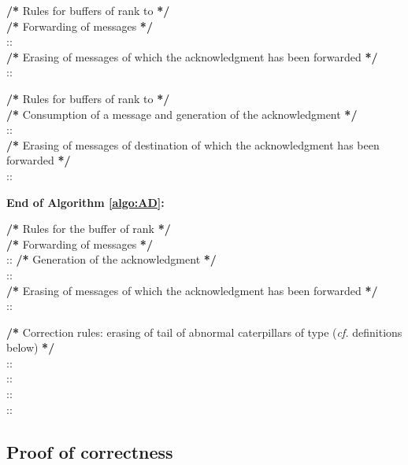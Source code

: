\documentclass[11pt]{article}
\begin{document}
\begin{algorithm}
{\begin{description}
				\item \textbf{/*} Rules for buffers of rank  to  \textbf{*/}\\
					\textbf{/*} Forwarding of messages \textbf{*/}\\
					 :: 
					\\
			\textbf{/*} Erasing of messages of which the acknowledgment has been forwarded \textbf{*/}\\
				 :: 
		\item \textbf{/*} Rules for buffers of rank  to  \textbf{*/}\\
			\textbf{/*} Consumption of a message and generation of the acknowledgment  \textbf{*/}\\
			 ::  \\
	\textbf{/*} Erasing of messages of destination  of which the acknowledgment has been forwarded \textbf{*/}\\
			 :: 
			\end{description}
}
\end{algorithm}

\begin{algorithm}
	\begin{description}
		\item \textbf{End of Algorithm \ref{algo:AD}:}
\small{
			\item \textbf{/*} Rules for the buffer of rank  \textbf{*/}\\
			\textbf{/*} Forwarding of messages \textbf{*/}\\
			 ::  
			\textbf{/*} Generation of the acknowledgment  \textbf{*/}\\
			 ::  \\
			\textbf{/*} Erasing of messages of which the acknowledgment has been forwarded \textbf{*/}\\
			 ::  
		\item \textbf{/*} Correction rules: erasing of tail of abnormal caterpillars of type  (\emph{cf.} definitions below) \textbf{*/}\\
			 ::  \\
			 ::  \\
			 ::  \\
			 :: 
}
	\end{description}
\end{algorithm}

\subsection{Proof of correctness}
\end{document}
